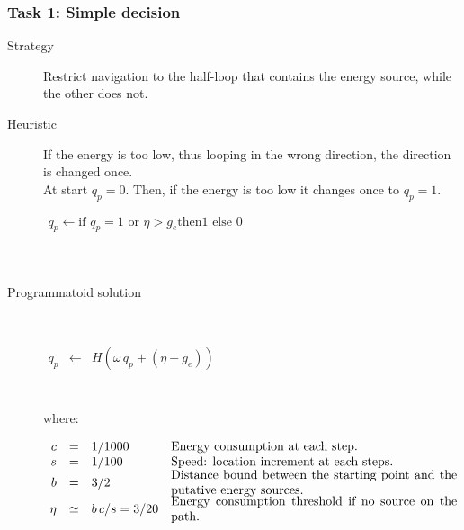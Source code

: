 \documentclass[a4]{article}
\newcommand{\eqline}[1]{~\vspace{0.1cm}\\\centerline{$#1$}\vspace{0.1cm}\\}
\begin{document}
\subsubsection{Task 1: Simple decision} \begin{description}
  \item[Strategy] Restrict navigation to the half-loop that contains the energy source, while the other does not.
  \item[Heuristic] If the energy is too low, thus looping in the wrong direction, the direction is changed once. \\
      At start $q_p = 0$. Then, if the energy is too low it changes once to $q_p = 1$.\eqline{\begin{array}{l}
          q_p \leftarrow \mbox{if } q_p = 1  \mbox{ or } \eta > g_e \mbox{then} 1 \mbox{ else } 0 \\
      \end{array}}
     \item[Programmatoid solution] \eqline{\begin{array}{rcl}
       q_p  &\leftarrow& H(\omega \, q_p + (\eta - g_e))\\
   \end{array}} where: \eqline{\begin{array}{rcll}
      c &=&1/1000 & \mbox{\parbox{8cm}{Energy consumption at each step.}}\\
      s &=&1/100 & \mbox{\parbox{8cm}{Speed: location increment at each steps.}}\\
      b &=& 3/2 & \mbox{\parbox{8cm}{Distance bound between the starting point and the putative energy sources.}}\\
      \eta &\simeq& b \, c/s = 3/20& \mbox{\parbox{8cm}{Energy consumption threshold if no source on the path.}}\\
  \end{array}}
\end{description}
\end{document}
